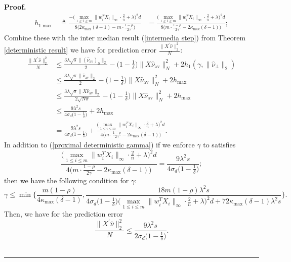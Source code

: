 \documentclass{article}
\theoremstyle{break}
\newenvironment{proof}[1][Proof]{\noindent\textbf{#1.} }{\ \rule{0.5em}{0.5em}}
\begin{document}
\begin{proof}
\begin{align}\label{hmax}
    h_{1\max}&\triangleq\frac{-\bigg(\max\limits_{1\leq i\leq m}\lVert w_i^TX_i\rVert_{\infty}\cdot \frac{2}{n}+\lambda\bigg)^2d}{8\bigg(2\kappa_{\max}(\delta-1)-m\cdot\frac{1-\rho}{2\gamma}\bigg)}
    &=\frac{\bigg(\max\limits_{1\leq i\leq m}\lVert w_i^TX_i\rVert_{\infty}\cdot \frac{2}{n}+\lambda\bigg)^2d}{8\bigg(m\cdot\frac{1-\rho}{2\gamma}-2\kappa_{\max}(\delta-1)\bigg)};
\end{align}
Combine these with the inter median result (\ref{intermedia step}) from Theorem \ref{deterministic result} we have for prediction error $\frac{\lVert X^{'}\hat{\nu}\rVert_2^2}{N}:$
\begin{align*}
      \frac{\lVert X^{'}\hat{\nu}\rVert_2^2}{N}&\leq\frac{3\lambda\sqrt{s}\lVert(\hat{\nu}_{\text{av}})_{S}\rVert_2}{2}-\bigg(1-\frac{1}{\delta}\bigg)\lVert X\hat{\nu}_{\text{av}}\rVert_N^2+2h_{1}(\gamma,\lVert\hat{\nu}_{\perp}\rVert_2)\\
      &\leq\frac{3\lambda\sqrt{s}\lVert\hat{\nu}_{\text{av}}\rVert_2}{2}-\bigg(1-\frac{1}{\delta}\bigg)\lVert X\hat{\nu}_{\text{av}}\rVert_N^2+2h_{\max}\\
      &\leq \frac{3\lambda\sqrt{s}\lVert X\hat{\nu}_{\text{av}}\rVert_2}{2\sqrt{N\sigma}}-\bigg(1-\frac{1}{\delta}\bigg)\lVert X\hat{\nu}_{\text{av}}\rVert_N^2+2h_{\max}\\
      &\leq \frac{9\lambda^2s}{4\sigma_{d}\bigg(1-\frac{1}{\delta}\bigg)}+2h_{\max}\\
      &=\frac{9\lambda^2s}{4\sigma_d\bigg(1-\frac{1}{\delta}\bigg)}+\frac{\bigg(\max\limits_{1\leq i\leq m}\lVert w_i^TX_i\rVert_{\infty}\cdot \frac{2}{n}+\lambda\bigg)^2d}{4\bigg(m\cdot\frac{1-\rho}{2\gamma}-2\kappa_{\max}(\delta-1)\bigg)}.
\end{align*}
In addition to (\ref{proximal deterministic gamma}) if we enforce $\gamma$ to satisfies
\begin{equation}
    \frac{\bigg(\max\limits_{1\leq i\leq m}\lVert w_i^TX_i\rVert_{\infty}\cdot \frac{2}{n}+\lambda\bigg)^2d}{4\bigg(m\cdot\frac{1-\rho}{2\gamma}-2\kappa_{\max}(\delta-1)\bigg)}=\frac{9\lambda^2s}{4\sigma_d\bigg(1-\frac{1}{\delta}\bigg)};
\end{equation}
then we have the following condition for $\gamma:$
\begin{equation*}
   \gamma\leq \min\bigg\{\frac{m(1-\rho)}{4\kappa_{\max}(\delta-1)}, \frac{18m(1-\rho)\lambda^2s}{4\sigma_d\bigg(1-\frac{1}{\delta}\bigg)\bigg(\max\limits_{1\leq i\leq m}\lVert w_i^TX_i\rVert_{\infty}\cdot \frac{2}{n}+\lambda\bigg)^2d+72\kappa_{\max}(\delta-1)\lambda^2s}\bigg\}.
\end{equation*}
Then, we have for the prediction error
\begin{equation*}
     \frac{\lVert X^{'}\hat{\nu}\rVert_2^2}{N}\leq \frac{9\lambda^2s}{2\sigma_d\bigg(1-\frac{1}{\delta}\bigg)}.
\end{equation*}
\end{proof}




\end{document}
